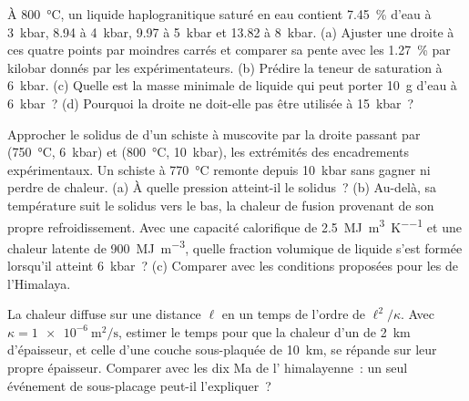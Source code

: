 \begin{exercise}[$\star\star$]\label{exo:b2:crustal-melting:9}
À \qty{800}{\celsius}, un liquide haplogranitique saturé en eau contient \qty{7.45}{\percent}
d'eau à \qty{3}{kbar}, 8.94 à \qty{4}{kbar}, 9.97 à \qty{5}{kbar} et 13.82 à
\qty{8}{kbar}. (a) Ajuster une droite à ces quatre points par moindres carrés et comparer
sa pente avec les \qty{1.27}{\percent} par kilobar donnés par les expérimentateurs.
(b) Prédire la teneur de saturation à \qty{6}{kbar}. (c) Quelle est la masse minimale de liquide
qui peut porter \qty{10}{\gram} d'eau à \qty{6}{kbar}~? (d) Pourquoi la droite ne doit-elle pas
être utilisée à \qty{15}{kbar}~?
\end{exercise}

\begin{exercise}[$\star\star\star$]\label{exo:b2:crustal-melting:10}
Approcher le solidus de  d'un schiste à muscovite par la droite passant par
(\qty{750}{\celsius}, \qty{6}{kbar}) et (\qty{800}{\celsius}, \qty{10}{kbar}),
les extrémités des encadrements expérimentaux. Un schiste à \qty{770}{\celsius} remonte depuis
\qty{10}{kbar} sans gagner ni perdre de chaleur. (a) À quelle pression atteint-il le
solidus~? (b) Au-delà, sa température suit le solidus vers le bas, la chaleur de fusion provenant
de son propre refroidissement. Avec une capacité calorifique de \qty{2.5}{\mega\joule\per\cubic\metre\per\kelvin}
et une chaleur latente de \qty{900}{\mega\joule\per\cubic\metre}, quelle fraction volumique de liquide
s'est formée lorsqu'il atteint \qty{6}{kbar}~? (c) Comparer avec les conditions proposées pour
les  de l'Himalaya.
\end{exercise}

\begin{exercise}[$\star\star\star$]\label{exo:b2:crustal-melting:11}
La chaleur diffuse sur une distance $\ell$ en un temps de l'ordre de $\ell^2/\kappa$. Avec
$\kappa = \qty{1e-6}{\square\metre\per\second}$, estimer le temps pour que la chaleur d'un
 de \qty{2}{km} d'épaisseur, et celle d'une couche sous-plaquée de \qty{10}{km}, se répande sur leur
propre épaisseur. Comparer avec les dix Ma de l' himalayenne~: un seul événement de sous-placage peut-il
l'expliquer~?
\end{exercise}

